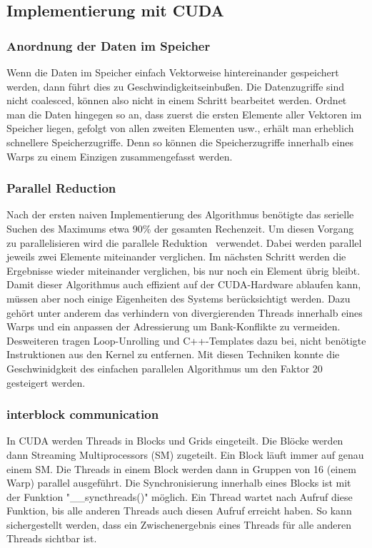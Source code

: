 \documentclass[ngerman]{scrartcl}
\begin{document}
\subsection{Implementierung mit CUDA}
\subsubsection{Anordnung der Daten im Speicher}
Wenn die Daten im Speicher einfach Vektorweise hintereinander gespeichert werden, 
dann führt dies zu Geschwindigkeitseinbußen. Die Datenzugriffe sind nicht coalesced, können also nicht in einem Schritt 
bearbeitet werden.
Ordnet man die Daten hingegen so an, dass zuerst die ersten Elemente aller Vektoren im Speicher liegen, gefolgt von allen zweiten Elementen usw., erhält man erheblich schnellere Speicherzugriffe.
Denn so können die Speicherzugriffe innerhalb eines Warps zu einem Einzigen zusammengefasst werden.

\subsubsection{Parallel Reduction}
Nach der ersten naiven Implementierung des Algorithmus benötigte das serielle Suchen des Maximums etwa 90\% der gesamten Rechenzeit. %
Um diesen Vorgang zu parallelisieren wird die parallele Reduktion~\cite{parallelreduction} verwendet.
Dabei werden parallel jeweils zwei Elemente miteinander verglichen.
Im nächsten Schritt werden die Ergebnisse wieder miteinander verglichen, bis nur noch ein Element übrig bleibt.
Damit dieser Algorithmus auch effizient auf der CUDA-Hardware ablaufen kann, müssen aber noch einige Eigenheiten des Systems berücksichtigt werden.
Dazu gehört unter anderem das verhindern von divergierenden Threads innerhalb eines Warps und ein anpassen der Adressierung um Bank-Konflikte zu vermeiden.
Desweiteren tragen Loop-Unrolling und C++-Templates dazu bei, nicht benötigte Instruktionen aus den Kernel zu entfernen.
Mit diesen Techniken konnte die Geschwinidgkeit des einfachen parallelen Algorithmus um den Faktor 20 gesteigert werden.
\subsubsection{interblock communication}
In CUDA werden Threads in Blocks und Grids eingeteilt.
Die Blöcke werden dann Streaming Multiprocessors (SM) zugeteilt.
Ein Block läuft immer auf genau einem SM.
Die Threads in einem Block werden dann in Gruppen von 16 (einem Warp) parallel ausgeführt.
Die Synchronisierung innerhalb eines Blocks ist mit der Funktion "\_\_syncthreads()" möglich.
Ein Thread wartet nach Aufruf diese Funktion, bis alle anderen Threads auch diesen Aufruf erreicht haben.
So kann sichergestellt werden, dass ein Zwischenergebnis eines Threads für alle anderen Threads sichtbar ist.
\end{document}
